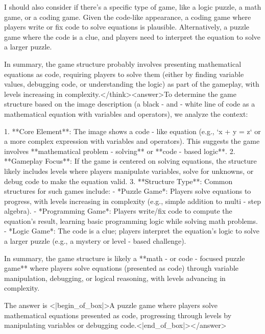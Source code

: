 I should also consider if there's a specific type of game, like a logic puzzle, a math game, or a coding game. Given the code-like appearance, a coding game where players write or fix code to solve equations is plausible. Alternatively, a puzzle game where the code is a clue, and players need to interpret the equation to solve a larger puzzle.

In summary, the game structure probably involves presenting mathematical equations as code, requiring players to solve them (either by finding variable values, debugging code, or understanding the logic) as part of the gameplay, with levels increasing in complexity.</think><answer>To determine the game structure based on the image description (a black - and - white line of code as a mathematical equation with variables and operators), we analyze the context:  

1. **Core Element**: The image shows a code - like equation (e.g., `x + y = z` or a more complex expression with variables and operators). This suggests the game involves **mathematical problem - solving** or **code - based logic**.  
2. **Gameplay Focus**: If the game is centered on solving equations, the structure likely includes levels where players manipulate variables, solve for unknowns, or debug code to make the equation valid.  
3. **Structure Type**: Common structures for such games include:  
   - *Puzzle Game*: Players solve equations to progress, with levels increasing in complexity (e.g., simple addition to multi - step algebra).  
   - *Programming Game*: Players write/fix code to compute the equation’s result, learning basic programming logic while solving math problems.  
   - *Logic Game*: The code is a clue; players interpret the equation’s logic to solve a larger puzzle (e.g., a mystery or level - based challenge).  

In summary, the game structure is likely a **math - or code - focused puzzle game** where players solve equations (presented as code) through variable manipulation, debugging, or logical reasoning, with levels advancing in complexity.  

The answer is <|begin_of_box|>A puzzle game where players solve mathematical equations presented as code, progressing through levels by manipulating variables or debugging code.<|end_of_box|></answer>